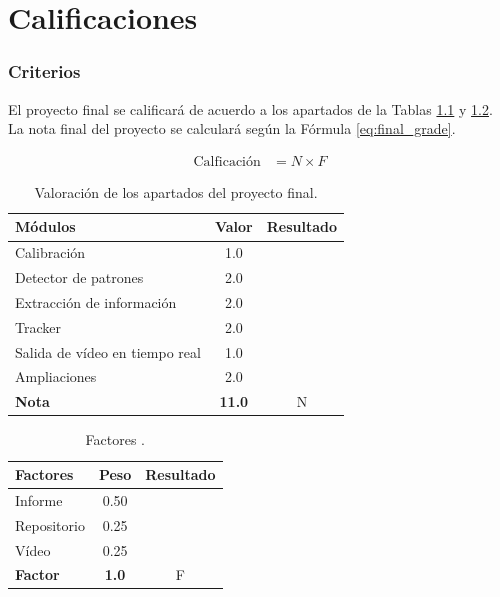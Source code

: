 \chapter{\textbf{Calificaciones}}
\label{chapter:calificaciones}

\subsection*{Criterios}
{}
\vspace{5mm}


El proyecto final se calificará de acuerdo a los apartados de la Tablas \ref{table:evaluacionI} y \ref{table:evaluacionII}. La nota final del proyecto se calculará según la Fórmula \ref{eq:final_grade}.

\begin{align}
     \text{Calficación} &= N \times F
    \label{eq:final_grade}
\end{align}

\begin{table}[h!]
    \centering
    \begin{tabular}{|l|c|c|}
    \hline
    \textbf{Módulos} & \textbf{Valor} & \textbf{Resultado} \\
    \hline
    Calibración & 1.0 & \\
    \hline
    Detector de patrones & 2.0 & \\
    \hline
    Extracción de información & 2.0 & \\
    \hline
    Tracker & 2.0 & \\
    \hline
    Salida de vídeo en tiempo real & 1.0 & \\
    \hline
    Ampliaciones & 2.0 & \\
    \hline
    \hline
    \textbf{Nota} & \textbf{11.0} & N \\
    \hline
    \end{tabular}
    \caption{Valoración de los apartados del proyecto final.}
    \label{table:evaluacionI}
\end{table}

\begin{table}[h!]
    \centering
    \begin{tabular}{|l|c|c|}
    \hline
    \textbf{Factores} & \textbf{Peso} & \textbf{Resultado} \\
    \hline
    Informe & 0.50 & \\
    \hline
    Repositorio & 0.25 & \\
    \hline
    Vídeo & 0.25 & \\
    \hline
    \hline
    \textbf{Factor} & \textbf{1.0} & F\\
    \hline
    \end{tabular}
    \caption{Factores .}
    \label{table:evaluacionII}
\end{table}
